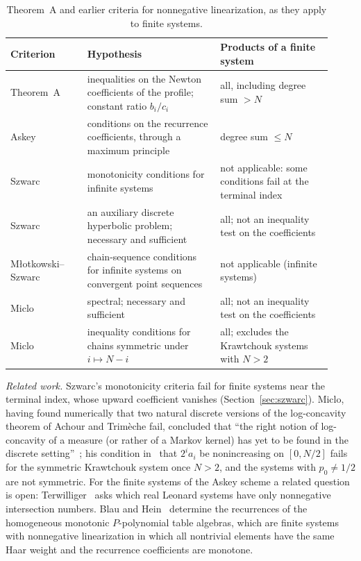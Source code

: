 \begin{table}[!t]
\centering
\caption{Theorem~A and earlier criteria for nonnegative linearization, as they apply to finite systems.}\label{tab:compare}
\renewcommand{\arraystretch}{1.15}
\begin{tabular}{@{}>{\raggedright\arraybackslash}p{0.22\linewidth}>{\raggedright\arraybackslash}p{0.38\linewidth}>{\raggedright\arraybackslash}p{0.32\linewidth}@{}}
Criterion & Hypothesis & Products of a finite system\\\hline
Theorem~A & inequalities on the Newton coefficients of the profile; constant ratio $b_i/c_i$ & all, including degree sum $>N$\\
Askey~\cite[Part~II]{askey} & conditions on the recurrence coefficients, through a maximum principle & degree sum $\leq N$\\
Szwarc~\cite[Thms.~3.2, 3.3]{szwarc} & monotonicity conditions for infinite systems & not applicable: some conditions fail at the terminal index\\
Szwarc~\cite[Thm.~1]{szwarc2003} & an auxiliary discrete hyperbolic problem; necessary and sufficient & all; not an inequality test on the coefficients\\
M{\l}otkowski--Szwarc~\cite{mlotszwarc} & chain-sequence conditions for infinite systems on convergent point sequences & not applicable (infinite systems)\\
Miclo~\cite[Prop.~3.3]{miclo} & spectral; necessary and sufficient & all; not an inequality test on the coefficients\\
Miclo~\cite[Thm.~31]{miclo2019} & inequality conditions for chains symmetric under $i\mapsto N-i$ & all; excludes the Krawtchouk systems with $N>2$
\end{tabular}
\end{table}

\emph{Related work.} Szwarc's monotonicity criteria fail for finite systems near the terminal index, whose upward coefficient vanishes (Section~\ref{sec:szwarc}). Miclo, having found numerically that two natural discrete versions of the log-concavity theorem of Achour and Trim\`eche fail, concluded that ``the right notion of log-concavity of a measure (or rather of a Markov kernel) has yet to be found in the discrete setting''~\cite[p.~433]{miclo}; his condition in~\cite[Theorem~31]{miclo2019} that $2^ia_i$ be nonincreasing on $[0,N/2]$ fails for the symmetric Krawtchouk system once $N>2$, and the systems with $p_0\neq1/2$ are not symmetric. For the finite systems of the Askey scheme a related question is open: Terwilliger~\cite[Problem~36.4]{terwilliger} asks which real Leonard systems have only nonnegative intersection numbers. Blau and Hein~\cite[Theorem~1.1]{blauhein} determine the recurrences of the homogeneous monotonic $P$-polynomial table algebras, which are finite systems with nonnegative linearization in which all nontrivial elements have the same Haar weight and the recurrence coefficients are monotone.

